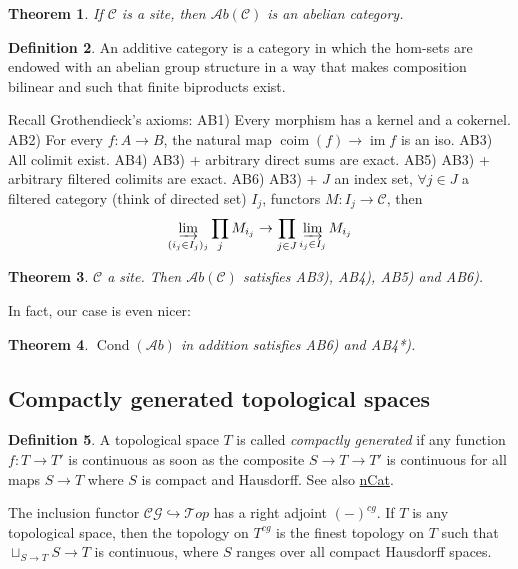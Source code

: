 \documentclass[11pt,A4]{article}
\theoremstyle{plain}
\newtheorem{thm}{Theorem}[section]
\theoremstyle{definition}
\newtheorem{defn}[thm]{Definition}
\theoremstyle{remark}
\newcommand{\1}{\mathbbm{1}}
\newcommand{\C}{\mathscr{C}}
\newcommand{\Top}{\mathscr{T}op}
\newcommand{\CG}{\mathscr{CG}}
\newcommand{\Ab}{\mathscr{A}b}
\DeclareMathOperator{\Cond}{Cond}
\DeclareMathOperator{\im}{im}
\begin{document}
\begin{thm}
    If $\C$ is a site, then $\Ab(\C)$ is an abelian category.
\end{thm}

\begin{defn}
    An additive category is a category in which the hom-sets are endowed with an abelian group structure in a way that makes composition bilinear and such that finite biproducts exist.
\end{defn}

Recall Grothendieck's axioms:
AB1) Every morphism has a kernel and a cokernel.
AB2) For every $f\colon A\to B$, the natural map $\operatorname{coim}(f)\to \im{f}$ is an iso.
AB3) All colimit exist.
AB4) AB3) + arbitrary direct sums are exact.
AB5) AB3) + arbitrary filtered colimits are exact.
AB6) AB3) + $J$ an index set, $\forall j\in J$ a filtered category (think of directed set) $I_{j}$, functors $M\colon I_{j}\to \C$, then
\[\varinjlim_{(i_{j}\in I_{j})_{j}}\prod_{j} M_{i_{j}}\to \prod_{j\in J}\varinjlim_{i_{j}\in I_{j}} M_{i_{j}} \]

\begin{thm}
    $\C$ a site. Then $\Ab(\C)$ satisfies AB3), AB4), AB5) and AB6).
\end{thm}

In fact, our case is even nicer:

\begin{thm}
    $\Cond(\Ab)$ in addition satisfies AB6) and AB4*).
\end{thm}

\subsection{Compactly generated topological spaces}

\begin{defn}
    A topological space $T$ is called \textit{compactly generated} if any function $f\colon T\to T'$ is continuous as soon as the composite $S\to T\to T'$ is continuous for all maps $S\to T$ where $S$ is compact and Hausdorff.
    See also \href{https://ncatlab.org/nlab/show/compactly+generated+topological+space}{nCat}.
\end{defn}

The inclusion functor $\CG \hookrightarrow \Top$ has a right adjoint $(-)^{cg}$.
If $T$ is any topological space, then the topology on $T^{cg}$ is the finest topology on $T$ such that $\sqcup_{S\to T}S\to T$ is continuous, where $S$ ranges over all compact Hausdorff spaces.
\end{document}
